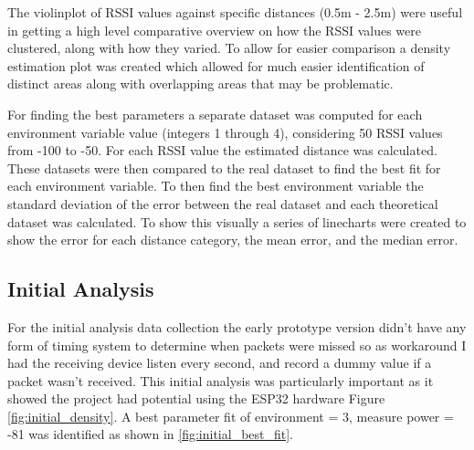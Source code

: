 \documentclass{l4proj}
\begin{document}
The violinplot of RSSI values against specific distances (0.5m - 2.5m) were useful in getting a high level comparative overview on how the RSSI values were clustered, along with how they varied. To allow for easier comparison a density estimation plot was created which allowed for much easier identification of distinct areas along with overlapping areas that may be problematic.

For finding the best parameters a separate dataset was computed for each environment variable value (integers 1 through 4), considering 50 RSSI values from -100 to -50. For each RSSI value the estimated distance was calculated. These datasets were then compared to the real dataset to find the best fit for each environment variable. To then find the best environment variable the standard deviation of the error between the real dataset and each theoretical dataset was calculated. To show this visually a series of linecharts were created to show the error for each distance category, the mean error, and the median error.

\subsection{Initial Analysis}

For the initial analysis data collection the early prototype version didn't have any form of timing system to determine when packets were missed so as workaround I had the receiving device listen every second, and record a dummy value if a packet wasn't received. This initial analysis was particularly important as it showed the project had potential using the ESP32 hardware Figure \ref{fig:initial_density}. A best parameter fit of environment = 3, measure power = -81 was identified as shown in \ref{fig:initial_best_fit}.
\end{document}

